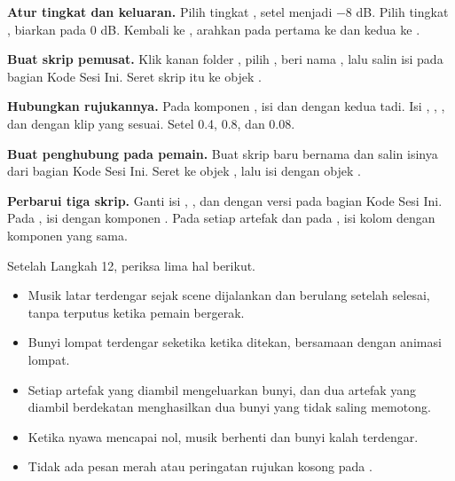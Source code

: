 \begin{langkah}
  \item \textbf{Atur tingkat dan keluaran.} Pilih tingkat , setel
         menjadi $-8$ dB. Pilih tingkat , biarkan
        pada 0 dB. Kembali ke , arahkan  pada
         pertama ke  dan 
        kedua ke .

  \item \textbf{Buat skrip pemusat.} Klik kanan folder ,
        pilih , beri nama , lalu
        salin isi pada bagian Kode Sesi Ini. Seret skrip itu ke objek
        .

  \item \textbf{Hubungkan rujukannya.} Pada  komponen
        , isi  dan 
        dengan kedua  tadi. Isi ,
        , , dan  dengan
        klip yang sesuai. Setel  0.4, 
        0.8, dan  0.08.

  \item \textbf{Buat penghubung pada pemain.} Buat skrip baru bernama
         dan salin isinya dari bagian Kode Sesi Ini. Seret
        ke objek , lalu isi  dengan objek
        .

  \item \textbf{Perbarui tiga skrip.} Ganti isi ,
        , dan  dengan versi pada bagian
        Kode Sesi Ini. Pada , isi  dengan
        komponen . Pada setiap artefak dan pada
        , isi kolom  dengan komponen yang
        sama.
\end{langkah}

\begin{ujibox}
Setelah Langkah 12, periksa lima hal berikut.
\begin{itemize}[leftmargin=1.4em, itemsep=0.2em]
  \item Musik latar terdengar sejak scene dijalankan dan berulang setelah
        selesai, tanpa terputus ketika pemain bergerak.
  \item Bunyi lompat terdengar seketika ketika  ditekan, bersamaan
        dengan animasi lompat.
  \item Setiap artefak yang diambil mengeluarkan bunyi, dan dua artefak yang
        diambil berdekatan menghasilkan dua bunyi yang tidak saling memotong.
  \item Ketika nyawa mencapai nol, musik berhenti dan bunyi kalah terdengar.
  \item Tidak ada pesan merah atau peringatan rujukan kosong pada
        .
\end{itemize}
\end{ujibox}

